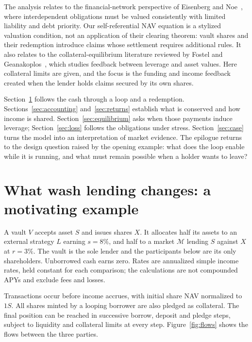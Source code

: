 \documentclass[12pt,oneside]{article}
\begin{document}
The analysis relates to the financial-network perspective of Eisenberg
and Noe~\cite{eisenberg-noe}, where interdependent obligations must be
valued consistently with limited liability and debt priority. Our
self-referential NAV equation is a stylized valuation condition, not an
application of their clearing theorem: vault shares and their redemption
introduce claims whose settlement requires additional rules. It also
relates to the collateral-equilibrium literature reviewed by Fostel
and Geanakoplos~\cite{fostel-geanakoplos}, which studies feedback between
leverage and asset values. Here collateral limits are given, and the
focus is the funding and income feedback created when the lender holds
claims secured by its own shares.

Section~\ref{sec:example} follows the cash through a loop and a
redemption. Sections~\ref{sec:accounting} and~\ref{sec:returns} establish
what is conserved and how income is shared.
Section~\ref{sec:equilibrium} asks when those payments induce leverage;
Section~\ref{sec:loss} follows the obligations under stress.
Section~\ref{sec:case} turns the model into an interpretation of market
evidence. The epilogue returns to the design question raised by the
opening example: what does the loop enable while it is running, and
what must remain possible when a holder wants to leave?

\section{What wash lending changes: a motivating example}

\label{sec:example}
A vault $V$ accepts asset $S$ and issues shares $X$. It allocates half
its assets to an external strategy $L$ earning $s=8\%$, and half to a
market $\mathcal M$ lending $S$ against $X$ at $r=3\%$. The vault is
the sole lender and the participants below are its only shareholders.
Unborrowed cash earns zero. Rates are annualized simple income rates,
held constant for each comparison; the calculations are not compounded
APYs and exclude fees and losses.

Transactions occur before income accrues, with initial share NAV
normalized to $1S$. All shares minted by a looping borrower are also
pledged as collateral. The final position can be reached in successive
borrow, deposit and pledge steps, subject to liquidity and collateral
limits at every step. Figure~\ref{fig:flows} shows the flows between
the three parties.
\end{document}
